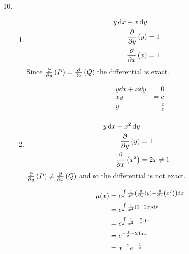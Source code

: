 \documentclass[10pt,\jkfside,a4paper]{article}
\begin{document}
\begin{enumerate}

\setcounter{enumi}{9}

\item 
\begin{enumerate}

\item 
\begin{equation}
\begin{split}
y \dd{x} + x \dd{y} \\
\pdv{y}\left(y\right) &= 1\\
\pdv{x}\left(x\right) &= 1\\
\end{split}
\end{equation}
Since $\pdv{y}\left(P\right) = \pdv{x}\left(Q\right)$ the differential is exact.

\begin{equation}
\begin{split}
y \dd{x} + x \dd{y} &= 0 \\
xy &= c\\
y &= \frac{c}{x}\\
\end{split}
\end{equation}

\item 
\begin{equation}
\begin{split}
y \dd{x} + x^2 \dd{y} \\
\pdv{y}\left(y\right) &= 1\\
\pdv{x}\left(x^2\right) &= 2x \neq 1\\
\end{split}
\end{equation}
$\pdv{y}\left(P\right) \neq \pdv{x}\left(Q\right)$ and so the differential is not exact.

\begin{equation}
\begin{split}
\mu(x) &= e^{\int\frac{1}{x^2}\left(\pdv{y}\left(y\right) - \pdv{x}\left(x^2\right) \right)\dd{x}}\\
	   &= e^{\int \frac{1}{x^2}\left( 1 - 2x\right) \dd{x}}\\
	   &= e^{\int \frac{1}{x^2} - \frac{2}{x} \dd{x}}\\
	   &= e^{-\frac{1}{x} - 2\ln x} \\
	   &= x^{-2}e^{-\frac{1}{x}} \\
\end{split}
\end{equation}


\end{enumerate}
\end{enumerate}
\end{document}
